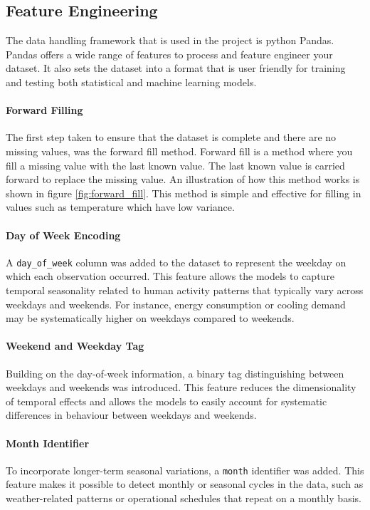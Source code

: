 \subsection{Feature Engineering}
The data handling framework that is used in the project is python Pandas. Pandas offers a wide range of features to process and feature engineer your dataset. It also sets the dataset into a format that is user friendly for training and testing both statistical and machine learning models. 

\paragraph{Forward Filling}
The first step taken to ensure that the dataset is complete and there are no missing values, was the forward fill method. Forward fill is a method where you fill a missing value with the last known value. The last known value is carried forward to replace the missing value. An illustration of how this method works is shown in figure \ref{fig:forward_fill}. This method is simple and effective for filling in values such as temperature which have low variance. 

\paragraph{Day of Week Encoding}
A \texttt{day\_of\_week} column was added to the dataset to represent the weekday on which each observation occurred. This feature allows the models to capture temporal seasonality related to human activity patterns that typically vary across weekdays and weekends. For instance, energy consumption or cooling demand may be systematically higher on weekdays compared to weekends.

\paragraph{Weekend and Weekday Tag}
Building on the day-of-week information, a binary tag distinguishing between weekdays and weekends was introduced. This feature reduces the dimensionality of temporal effects and allows the models to easily account for systematic differences in behaviour between weekdays and weekends.

\paragraph{Month Identifier}
To incorporate longer-term seasonal variations, a \texttt{month} identifier was added. This feature makes it possible to detect monthly or seasonal cycles in the data, such as weather-related patterns or operational schedules that repeat on a monthly basis.

